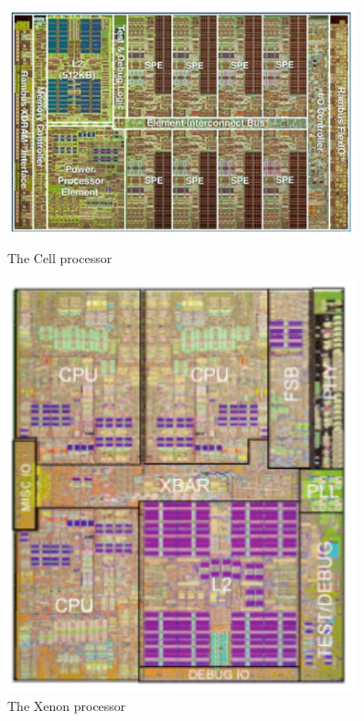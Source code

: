 \documentclass[10pt,a4paper]{article}
\begin{document}
						\begin{figure}[H]
							\centering
							\begin{minipage}{0.45\textwidth}
								\centering
								\includegraphics[width=0.9\textwidth]{./images/Cell.png}
								\caption{The Cell processor}
							\end{minipage}\hfill
							\begin{minipage}{0.45\textwidth}
								\centering
								\includegraphics[width=0.9\textwidth]{./images/Xenon.png}
								\caption{The Xenon processor}
							\end{minipage}
						\end{figure}
			
\end{document}
